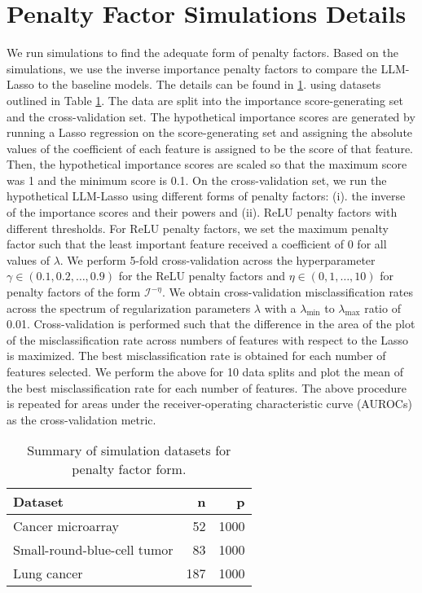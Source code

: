 \section{Penalty Factor Simulations Details}\label{appdx:sim}
We run simulations to find the adequate form of penalty factors. Based on the simulations, we use the inverse importance penalty factors to compare the LLM-Lasso to the baseline models. The details can be found in \ref{appdx:sim}. using datasets outlined in Table \ref{tab:simulation_data}. The data are split into the importance score-generating set and the cross-validation set. The hypothetical importance scores are generated by running a Lasso regression on the score-generating set and assigning the absolute values of the coefficient of each feature is assigned to be the score of that feature. Then, the hypothetical importance scores are scaled so that the maximum score was 1 and the minimum score is 0.1. On the cross-validation set, we run the hypothetical LLM-Lasso using different forms of penalty factors: (i). the inverse of the importance scores and their powers and (ii). ReLU penalty factors with different thresholds. For ReLU penalty factors, we set the maximum penalty factor such that the least important feature received a coefficient of 0 for all values of $\lambda$. We perform 5-fold cross-validation across the hyperparameter $\gamma \in (0.1, 0.2, \ldots, 0.9)$ for the ReLU penalty factors and $\eta \in (0, 1, \ldots, 10)$ for penalty factors of the form $\mathcal{I}^{-\eta}$. We obtain cross-validation misclassification rates across the spectrum of regularization parameters $\lambda$ with a $\lambda_\text{min}$ to $\lambda_\text{max}$ ratio of 0.01. Cross-validation is performed such that the difference in the area of the plot of the misclassification rate across numbers of features with respect to the Lasso is maximized. The best misclassification rate is obtained for each number of features selected. We perform the above for 10 data splits and plot the mean of the best misclassification rate for each number of features. The above procedure is repeated for areas under the receiver-operating characteristic curve (AUROCs) as the cross-validation metric. \begin{table}[h!]
\small
\centering
\begin{tabular}{lrr}
\toprule
\textbf{Dataset} & \textbf{n} & \textbf{p} \\
\midrule
Cancer microarray \cite{ramaswamy2001multiclass}  & 52 & 1000 \\
Small-round-blue-cell tumor \cite{khan2001classification} & 83 & 1000 \\
Lung cancer \cite{spira2007airway} & 187 & 1000 \\
\bottomrule
\end{tabular}
\caption{Summary of simulation datasets for penalty factor form.}
\label{tab:simulation_data}
\end{table}
 
